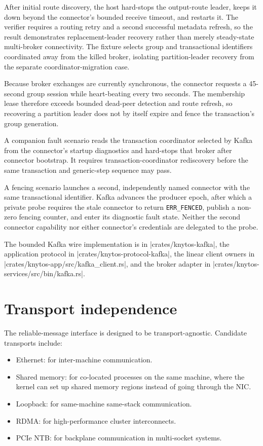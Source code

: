 After
initial route discovery, the host hard-stops the output-route leader, keeps it
down beyond the connector's bounded receive timeout, and restarts it. The
verifier requires a routing retry and a second successful metadata refresh, so the
result demonstrates replacement-leader recovery rather than merely
steady-state multi-broker connectivity. The fixture selects group and
transactional identifiers coordinated away from the killed broker, isolating
partition-leader recovery from the separate coordinator-migration case.

Because broker exchanges are currently synchronous, the connector requests a
45-second group session while heart-beating every two seconds. The membership
lease therefore exceeds bounded dead-peer detection and route refresh, so
recovering a partition leader does not by itself expire and fence the
transaction's group generation.

A companion fault scenario reads the transaction coordinator selected by
Kafka from the connector's startup diagnostics and hard-stops that broker
after connector bootstrap. It requires transaction-coordinator rediscovery
before the same transaction and generic-step sequence may pass.

A fencing scenario launches a second, independently named connector with the
same transactional identifier. Kafka advances the producer epoch, after which a private
probe requires the stale connector to return \texttt{ERR\_FENCED}, publish
a non-zero fencing counter, and enter its diagnostic fault state. Neither the
second connector capability nor either connector's credentials are delegated
to the probe.

The bounded Kafka wire implementation is in
\repodir|crates/knytos-kafka|, the application protocol in
\repodir|crates/knytos-protocol-kafka|, the linear client owners in
\repofile|crates/knytos-app/src/kafka_client.rs|, and the broker adapter in
\repofile|crates/knytos-services/src/bin/kafka.rs|.

\section{Transport independence}

The reliable-message interface is designed to be transport-agnostic. Candidate
transports include:

\begin{itemize}
    \item Ethernet: for inter-machine communication.
    \item Shared memory: for co-located processes on the same machine,
        where the kernel can set up shared memory regions instead of going through
        the NIC.
    \item Loopback: for same-machine same-stack communication.
    \item RDMA: for high-performance cluster interconnects.
    \item PCIe NTB: for backplane communication in multi-socket
        systems.
\end{itemize}

